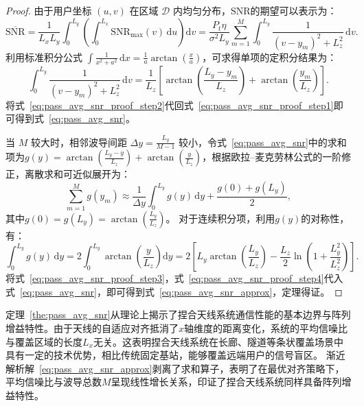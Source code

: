 \begin{proof}
	由于用户坐标 $(u,v)$ 在区域 $\mathcal{D}$ 内均匀分布，SNR的期望可以表示为：
	\begin{equation}\label{eq:pass_avg_snr_proof_step1}
		\overline{\mathrm{SNR}} = \frac{1}{L_x L_y} \int_0^{L_y} \left( \int_0^{L_x} \mathrm{SNR}_{\max}(v) \, \mathrm{d}u \right) \mathrm{d}v = \frac{P_t \eta}{\sigma^2 L_y} \sum_{m=1}^M \int_0^{L_y} \frac{1}{(v - y_m)^2 + L_z^2} \, \mathrm{d}v.
	\end{equation}
	利用标准积分公式 $\int \frac{1}{x^2 + a^2} \, \mathrm{d}x = \frac{1}{a} \arctan(\frac{x}{a})$，可求得单项的定积分结果为：
	\begin{equation}\label{eq:pass_avg_snr_proof_step2}
		\int_0^{L_y} \frac{1}{(v - y_m)^2 + L_z^2} \, \mathrm{d}v = \frac{1}{L_z} \left[ \arctan\left(\frac{L_y - y_m}{L_z}\right) + \arctan\left(\frac{y_m}{L_z}\right) \right].
	\end{equation}
	将式~\eqref{eq:pass_avg_snr_proof_step2}代回式~\eqref{eq:pass_avg_snr_proof_step1}即可得到式~\eqref{eq:pass_avg_snr}。
	
	当 $M$ 较大时，相邻波导间距 $\Delta y = \frac{L_y}{M-1}$ 较小，令式~\eqref{eq:pass_avg_snr}中的求和项为$g(y) = \arctan(\frac{L_y - y}{L_z}) + \arctan(\frac{y}{L_z})$，根据欧拉–麦克劳林公式的一阶修正，离散求和可近似展开为：
	\begin{equation}\label{eq:pass_avg_snr_proof_step3}
		\sum_{m=1}^M g(y_m) \approx \frac{1}{\Delta y} \int_0^{L_y} g(y) \, \mathrm{d}y + \frac{g(0) + g(L_y)}{2},
	\end{equation}
	其中$g(0) = g(L_y) = \arctan(\frac{L_y}{L_z})$。
	对于连续积分项，利用$g(y)$的对称性，有：
	\begin{equation}\label{eq:pass_avg_snr_proof_step4}
		\int_0^{L_y} g(y) \, \mathrm{d}y = 2 \int_0^{L_y} \arctan\left(\frac{y}{L_z}\right) \mathrm{d}y = 2 \left[ L_y \arctan\left(\frac{L_y}{L_z}\right) - \frac{L_z}{2} \ln\left(1 + \frac{L_y^2}{L_z^2}\right) \right].
	\end{equation}
	将式~\eqref{eq:pass_avg_snr_proof_step3}，式~\eqref{eq:pass_avg_snr_proof_step4}代入式~\eqref{eq:pass_avg_snr}，即可得到式~\eqref{eq:pass_avg_snr_approx}，定理得证。
\end{proof}

定理~\ref{the:pass_avg_snr}从理论上揭示了捏合天线系统通信性能的基本边界与阵列增益特性。由于天线的自适应对齐抵消了$x$轴维度的距离变化，系统的平均信噪比与覆盖区域的长度$L_x$无关。这表明捏合天线系统在长廊、隧道等条状覆盖场景中具有一定的技术优势，相比传统固定基站，能够覆盖远端用户的信号盲区。
渐近解析解~\eqref{eq:pass_avg_snr_approx}剥离了求和算子，表明了在最优对齐策略下，平均信噪比与波导总数$M$呈现线性增长关系，印证了捏合天线系统同样具备阵列增益特性。

